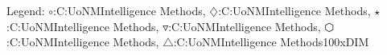 Legend: {\color{NavyBlue}$\circ$}:C:\University\Undergraduate UoNM\Artificial Intelligence Methods\CW\data{}, {\color{Magenta}$\diamondsuit$}:C:\University\Undergraduate UoNM\Artificial Intelligence Methods\CW\data{}, {\color{Orange}$\star$}:C:\University\Undergraduate UoNM\Artificial Intelligence Methods\CW\data{}, {\color{CornflowerBlue}$\triangledown$}:C:\University\Undergraduate UoNM\Artificial Intelligence Methods\CW\data{}, {\color{red}$\varhexagon$}:C:\University\Undergraduate UoNM\Artificial Intelligence Methods\CW\data{}, {\color{YellowGreen}$\triangle$}:C:\University\Undergraduate UoNM\Artificial Intelligence Methods\CW\data\pop100xDIM